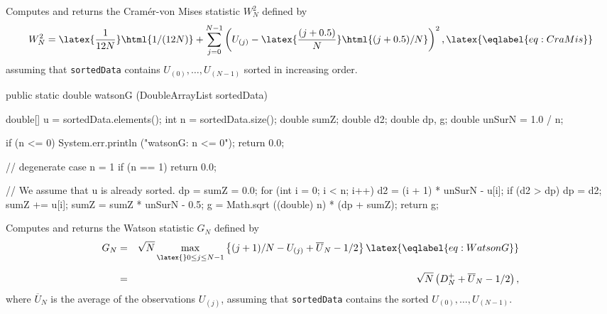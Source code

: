  \begin{tabb} Computes and returns the Cram\'er-von Mises statistic $W_N^2$
    defined by
  \begin {equation}
     W_N^2 = \latex{\frac{1}{ 12N}}\html{1/(12N)} +
            \sum_{j=0}^{N-1} \left (U_{(j)} - \latex{\frac{(j+0.5) }{ N}}\html{(j+0.5)/N}\right)^2,
                                                   \latex{\eqlabel {eq:CraMis}}
  \end {equation}
 assuming that \texttt{sortedData} contains $U_{(0)},\dots,U_{(N-1)}$
 sorted in increasing order.
 \end{tabb}
\begin{htmlonly}
\end{htmlonly}
\begin{code}

   public static double watsonG (DoubleArrayList sortedData)\begin{hide} {
      double[] u = sortedData.elements();
      int n = sortedData.size();
      double sumZ;
      double d2;
      double dp, g;
      double unSurN = 1.0 / n;

      if (n <= 0) {
         System.err.println ("watsonG: n <= 0");
         return 0.0;
      }

      // degenerate case n = 1
      if (n == 1)
         return 0.0;

      // We assume that u is already sorted.
      dp = sumZ = 0.0;
      for (int i = 0; i < n; i++) {
         d2 = (i + 1) * unSurN - u[i];
         if (d2 > dp)
            dp = d2;
         sumZ += u[i];
      }
      sumZ = sumZ * unSurN - 0.5;
      g = Math.sqrt ((double) n) * (dp + sumZ);
      return g;
   }\end{hide}
\end{code}
 \begin{tabb} Computes and returns the Watson statistic $G_N$
    defined by
 \begin {eqnarray}
  G_N &=& \sqrt{N} \max_{\latex{\rule{0pt}{7pt}} 0\le j \le N-1}
    \left\{ (j+1)/N -
         U_{(j)} + \overline{U}_N - 1/2 \right\}
                                            \latex{\eqlabel {eq:WatsonG}} \\[6pt]
    &=& \sqrt{N}\left (D_N^+ + \overline{U}_N  - 1/2\right), \nonumber
 \end {eqnarray}
  where $\overline{U}_N$ is the average of the observations $U_{(j)}$,
  assuming that \texttt{sortedData} contains the sorted $U_{(0)},\dots,U_{(N-1)}$.
 \end{tabb}
